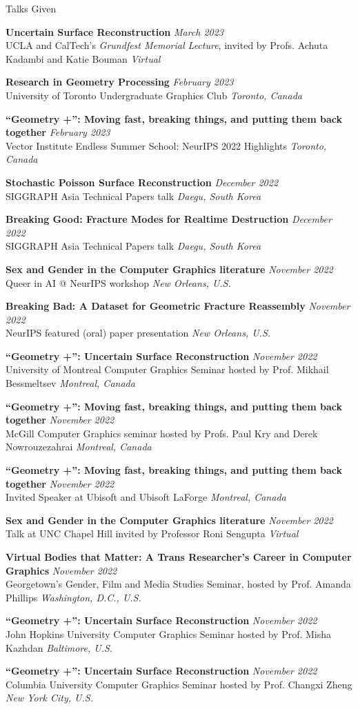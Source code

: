 \documentclass{resume}
\newcommand{\talk}[4]{
    {\bf #1} \hfill {\em \small #2} \\ %
    {\small #3} \hfill {\em \small #4}
}
\begin{document}
\begin{rSection}{Talks Given}
\talk{Uncertain Surface Reconstruction}{March 2023}{UCLA and CalTech's \textit{Grundfest Memorial Lecture}, invited by Profs. Achuta Kadambi and Katie Bouman}{Virtual}

\talk{Research in Geometry Processing}{February 2023}
{University of Toronto Undergraduate Graphics Club}{Toronto, Canada}

\talk{``Geometry +'': Moving fast, breaking things, and putting them back together}{February 2023}{Vector Institute Endless Summer School: NeurIPS 2022 Highlights}{Toronto, Canada}

\talk{Stochastic Poisson Surface Reconstruction}{December 2022}{SIGGRAPH Asia Technical Papers talk}{Daegu, South Korea}

\talk{Breaking Good: Fracture Modes for Realtime Destruction}{December 2022}{SIGGRAPH Asia Technical Papers talk}{Daegu, South Korea}

\talk{Sex and Gender in the Computer Graphics literature}{November 2022}{Queer in AI @ NeurIPS workshop}{New Orleans, U.S.}

\talk{Breaking Bad: A Dataset for Geometric Fracture Reassembly}{November 2022}{NeurIPS featured (oral) paper presentation}{New Orleans, U.S.}

\talk{``Geometry +'': Uncertain Surface Reconstruction}{November 2022}{University of Montreal Computer Graphics Seminar hosted by Prof. Mikhail Bessmeltsev}{Montreal, Canada}

\talk{``Geometry +'': Moving fast, breaking things, and putting them back together}{November 2022}{McGill Computer Graphics seminar hosted by Profs. Paul Kry and Derek Nowrouzezahrai}{Montreal, Canada}

\talk{``Geometry +'': Moving fast, breaking things, and putting them back together}{November 2022}{Invited Speaker at Ubisoft and Ubisoft LaForge}{Montreal, Canada}

\talk{Sex and Gender in the Computer Graphics literature}{November 2022}{Talk at UNC Chapel Hill invited by Professor Roni Sengupta}{Virtual}

\talk{Virtual Bodies that Matter: A Trans Researcher’s Career in Computer Graphics}{November 2022}{Georgetown's Gender, Film and Media Studies Seminar, hosted by Prof. Amanda Phillips}{Washington, D.C., U.S.}

\talk{``Geometry +'': Uncertain Surface Reconstruction}{November 2022}{John Hopkins University Computer Graphics Seminar hosted by Prof. Misha Kazhdan}{Baltimore, U.S.}

\talk{``Geometry +'': Uncertain Surface Reconstruction}{November 2022}{Columbia University Computer Graphics Seminar hosted by Prof. Changxi Zheng}{New York City, U.S.}


\end{rSection}
\end{document}
